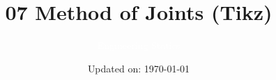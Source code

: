 \documentclass[9pt, xcolor={svgnames, x11names},professionalfonts]{beamer}
\title[07 MoJ Tikz]{\Huge 07 Method of Joints (Tikz)}
\subtitle[Engineering Statics]{\Large\textcolor{white}{Engineering Statics}}
\author{}
\date{\small Updated on: \today}
\def\scale{1}
\begin{document}

\begin{frame}[plain]    %
	\titlepage
\end{frame}




% 	


% 	


% 	


% 	


% 	


% 	

\end{document}
